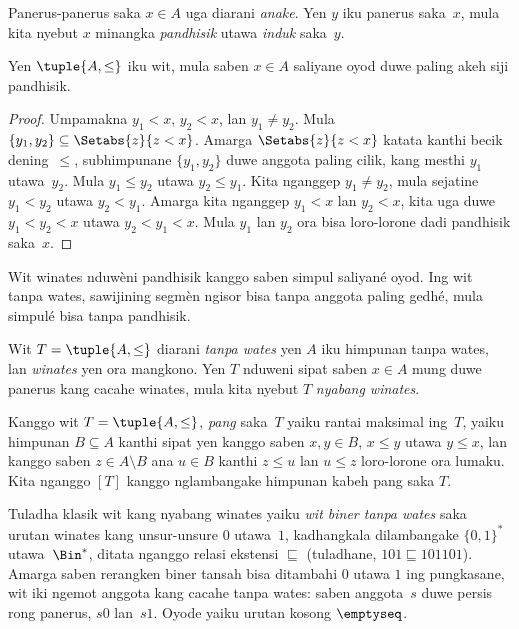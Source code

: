 \documentclass[../../../include/open-logic-section]{subfiles}
\begin{document}
Panerus-panerus saka $x \in A$ uga diarani \emph{anake}.
Yen $y$ iku panerus saka~$x$, mula kita nyebut $x$
minangka \emph{pandhisik} utawa \emph{induk} saka~$y$.

\begin{prop}
Yen $\tuple{A,\le}$ iku wit, mula saben $x \in A$
saliyane oyod duwe paling akeh siji pandhisik.
\end{prop}

\begin{proof}
  Umpamakna $y_1 < x$, $y_2 < x$, lan $y_1 \neq y_2$.
  Mula $\{y_1,y_2\} \subseteq \Setabs{z}{z<x}$.
  Amarga $\Setabs{z}{z<x}$ katata kanthi becik
  dening~$\le$, subhimpunane $\{y_1, y_2\}$
  duwe anggota paling cilik, kang mesthi
  $y_1$ utawa~$y_2$.
  Mula $y_1 \le y_2$ utawa $y_2 \le y_1$.
  Kita nganggep $y_1 \neq y_2$, mula sejatine
  $y_1 < y_2$ utawa $y_2 < y_1$.
  Amarga kita nganggep $y_1 < x$ lan $y_2 < x$,
  kita uga duwe $y_1 < y_2< x$ utawa
  $y_2 < y_1 < x$.
  Mula $y_1$ lan $y_2$ ora bisa loro-lorone
  dadi pandhisik saka~$x$.
\end{proof}
Wit winates nduwèni pandhisik kanggo saben simpul saliyané oyod.
Ing wit tanpa wates, sawijining segmèn ngisor bisa tanpa
anggota paling gedhé, mula simpulé bisa tanpa pandhisik.

\begin{defn}
Wit $T = \tuple{A, \le}$ diarani \emph{tanpa wates}
yen $A$ iku himpunan tanpa wates, lan
\emph{winates} yen ora mangkono.
Yen $T$ nduweni sipat saben $x \in A$
mung duwe panerus kang cacahe winates,
mula kita nyebut $T$ \emph{nyabang winates}.
\end{defn}

\begin{defn}[Pang]
Kanggo wit $T = \tuple{A, \le}$, \emph{pang} saka~$T$
yaiku rantai maksimal ing~$T$, yaiku himpunan
$B \subseteq A$ kanthi sipat yen kanggo saben
$x, y \in B$, $x \le y$ utawa $y \le x$,
lan kanggo saben $z \in A \setminus B$
ana $u \in B$ kanthi $z \le u$ lan $u \le z$
loro-lorone ora lumaku.
%
Kita nganggo $[T]$ kanggo nglambangake
himpunan kabeh pang saka $T$.
\end{defn}

\begin{ex}
Tuladha klasik wit kang nyabang winates yaiku
\emph{wit biner tanpa wates} saka urutan winates
kang unsur-unsure $0$ utawa~$1$, kadhangkala
dilambangake $\{0,1\}^*$ utawa~$\Bin^*$,
ditata nganggo relasi ekstensi $\sqsubseteq$
(tuladhane, $101 \sqsubseteq 101101$).
Amarga saben rerangken biner tansah bisa
ditambahi $0$ utawa $1$ ing pungkasane,
wit iki ngemot anggota kang cacahe tanpa wates:
saben anggota~$s$ duwe persis rong panerus,
$s0$ lan~$s1$.
Oyode yaiku urutan kosong $\emptyseq$.
\end{ex}
\end{document}
